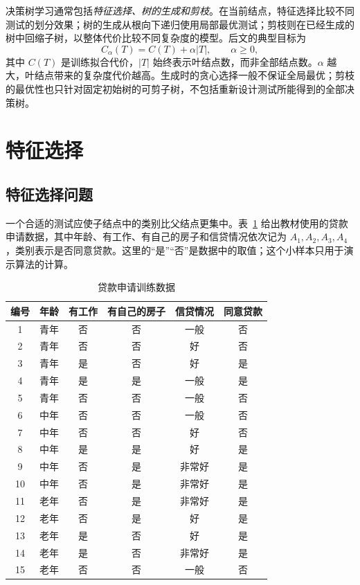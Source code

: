 决策树学习通常包括\emph{特征选择、树的生成和剪枝}。在当前结点，特征选择比较不同测试的划分效果；树的生成从根向下递归使用局部最优测试；剪枝则在已经生成的树中回缩子树，以整体代价比较不同复杂度的模型。后文的典型目标为
\begin{equation}
  C_\alpha(T)=C(T)+\alpha|T|,\qquad \alpha\geq0,
  \label{eq:lihang-tree-regularization}
\end{equation}
其中 $C(T)$ 是训练拟合代价，$|T|$ 始终表示叶结点数，而非全部结点数。$\alpha$ 越大，叶结点带来的复杂度代价越高。生成时的贪心选择一般不保证全局最优；剪枝的最优性也只针对固定初始树的可剪子树，不包括重新设计测试所能得到的全部决策树。

\section{特征选择}
\label{sec:lihang-tree-feature-selection}

\subsection{特征选择问题}

一个合适的测试应使子结点中的类别比父结点更集中。表~\ref{tab:lihang-loan-data} 给出教材使用的贷款申请数据，其中年龄、有工作、有自己的房子和信贷情况依次记为 $A_1,A_2,A_3,A_4$，类别表示是否同意贷款。这里的“是”“否”是数据中的取值；这个小样本只用于演示算法的计算。

\begin{table}
  \centering
  \caption{贷款申请训练数据}
  \label{tab:lihang-loan-data}
  \begin{tabular}{cccccc}
    \toprule
    编号 & 年龄 & 有工作 & 有自己的房子 & 信贷情况 & 同意贷款 \\
    \midrule
    1 & 青年 & 否 & 否 & 一般 & 否 \\
    2 & 青年 & 否 & 否 & 好 & 否 \\
    3 & 青年 & 是 & 否 & 好 & 是 \\
    4 & 青年 & 是 & 是 & 一般 & 是 \\
    5 & 青年 & 否 & 否 & 一般 & 否 \\
    6 & 中年 & 否 & 否 & 一般 & 否 \\
    7 & 中年 & 否 & 否 & 好 & 否 \\
    8 & 中年 & 是 & 是 & 好 & 是 \\
    9 & 中年 & 否 & 是 & 非常好 & 是 \\
    10 & 中年 & 否 & 是 & 非常好 & 是 \\
    11 & 老年 & 否 & 是 & 非常好 & 是 \\
    12 & 老年 & 否 & 是 & 好 & 是 \\
    13 & 老年 & 是 & 否 & 好 & 是 \\
    14 & 老年 & 是 & 否 & 非常好 & 是 \\
    15 & 老年 & 否 & 否 & 一般 & 否 \\
    \bottomrule
  \end{tabular}
\end{table}

